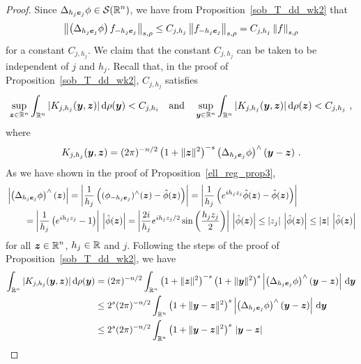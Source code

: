 \begin{proof}
Since $\displaystyle \Delta_{h_j{\bm{e}}_j} \phi \in \mathcal{S}(\mathbb{R}^n)$, we have
from Proposition~\ref{sob_T_dd_wk2} that
\[
\left\| \left( \Delta_{h_j{\bm{e}}_j} \phi \right) f_{-h_j{\bm{e}}_j}
\right\|_{s,\rho}
\leq C_{j,h_j} \left\| f_{-h_j{\bm{e}}_j} \right\|_{s,\rho}
= C_{j,h_j} \left\| f \right\|_{s,\rho}
\]
for a constant $C_{j,h_j}$.  We claim that the constant $C_{j,h_j}$ can be taken
to be independent of $j$ and $h_j$.  Recall that, in the proof of
Proposition~\ref{sob_T_dd_wk2}, $C_{j,h_j}$ satisfies 
\begin{equation} \label{DeltaBoundOpEq1}
\sup_{{\bm{z}}\in\mathbb{R}^n}
\int_{\mathbb{R}^n} |K_{j,h_j}({\bm{y}},{\bm{z}})|\,\mathrm{d}{\rho({\bm{y}})} < C_{j,h_i} \quad
\text{and} \quad
\sup_{{\bm{y}}\in\mathbb{R}^n}
\int_{\mathbb{R}^n} |K_{j,h_j}({\bm{y}},{\bm{z}})|\,\mathrm{d}{\rho({\bm{z}})} < C_{j,h_j} \ ,
\end{equation}
where
\[
K_{j,h_j}(\VEC{y},\VEC{z}) =(2\pi)^{-n/2} \left(1+\|\VEC{z}\|^2\right)^{-s}
\left(\Delta_{h_j\VEC{e}_j} \phi\right)^\wedge(\VEC{y} - \VEC{z}) \ .
\]
As we have shown in the proof of Proposition~\ref{ell_reg_prop3}, 
\begin{align*}
&\left| \left(\Delta_{h_j{\bm{e}}_j} \phi\right)^\wedge({\bm{z}}) \right|
= \left| \frac{1}{h_j} \left( (\phi_{-h_j{\bm{e}}_j})^\wedge({\bm{z}})
- \hat{\phi}({\bm{z}}) \right)\right|
= \left|\frac{1}{h_j} \left( e^{ih_jz_j} \hat{\phi}({\bm{z}})
- \hat{\phi}({\bm{z}}) \right)\right| \\
&\qquad = \left|\frac{1}{h_j} \left( e^{ih_jz_j} - 1 \right)\right|\,
\left| \hat{\phi}({\bm{z}})\right|
= \left| \frac{2i}{h_j} e^{ih_jz_j/2} \sin\left(\frac{h_jz_j}{2}\right)\right|\,
\left|\hat{\phi}({\bm{z}})\right|
\leq |z_j|\, \left|\hat{\phi}({\bm{z}})\right|
\leq |{\bm{z}}| \, \left|\hat{\phi}({\bm{z}})\right|
\end{align*}
for all $\displaystyle {\bm{z}} \in \mathbb{R}^n$, $h_j \in \mathbb{R}$ and $j$.
Following the steps of the proof of Proposition~\ref{sob_T_dd_wk2}, we
have
\begin{align*}
\int_{\RR^n}|K_{j,h_j}(\VEC{y},\VEC{z})| \dx{\rho(\VEC{y})}
&= (2\pi)^{-n/2} \int_{\RR^n} \left(1+\|\VEC{z}\|^2\right)^{-s}
\left(1+\|\VEC{y}\|^2\right)^{s}
\left| \left(\Delta_{h_j\VEC{e}_j} \phi\right)^\wedge
(\VEC{y} - \VEC{z})\right|\dx{\VEC{y}} \\
&\leq 2^s (2\pi)^{-n/2} \int_{\RR^n} \left(1+\|\VEC{y}-\VEC{z}\|^2\right)^{s}
\left|\left(\Delta_{h_j\VEC{e}_j} \phi\right)^\wedge
(\VEC{y} - \VEC{z})\right|\dx{\VEC{y}} \\
&\leq 2^s (2\pi)^{-n/2} \int_{\RR^n} \left(1+\|\VEC{y}-\VEC{z}\|^2\right)^{s}
\,|\VEC{y}-\VEC{z}|\,

\end{align*}
\end{proof}
